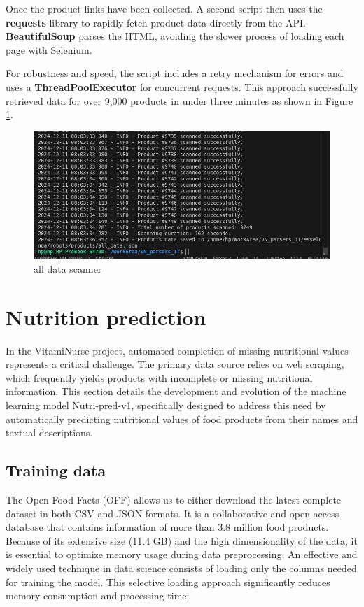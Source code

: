 Once the product links have been collected. A second script then uses the \textbf{requests} library to rapidly fetch product data directly from the API. \textbf{BeautifulSoup} parses the HTML, avoiding the slower process of loading each page with Selenium.

For robustness and speed, the script includes a retry mechanism for errors and uses a \textbf{ThreadPoolExecutor} for concurrent requests. This approach successfully retrieved data for over 9,000 products in under three minutes as shown in Figure \ref{fig:all_data_scanner}.

\begin{figure}[H]
            \centering
            \includegraphics[scale=0.42]{images/all_data_scanner.png}
            \caption{all data scanner} 
            \label{fig:all_data_scanner}
\end{figure}




\newpage
\section{Nutrition prediction}
In the VitamiNurse project, automated completion of missing nutritional values represents a critical challenge. The primary data source relies on web scraping, which frequently yields products with incomplete or missing nutritional information. This section details the development and evolution of the machine learning model Nutri-pred-v1, specifically designed to address this need by automatically predicting nutritional values of food products from their names and textual descriptions.

\subsection{Training data}

 The Open Food Facts (OFF) allows us to either download the latest complete dataset in both CSV and JSON formats. It is  a collaborative and open-access database that contains information of more than 3.8 million food products. Because of its extensive size (11.4 GB) and the high dimensionality of the data, it is essential to optimize memory usage during data preprocessing. 
  An effective and widely used technique in data science consists of loading only the columns needed for training the model. This selective loading approach significantly reduces memory consumption and processing time.

